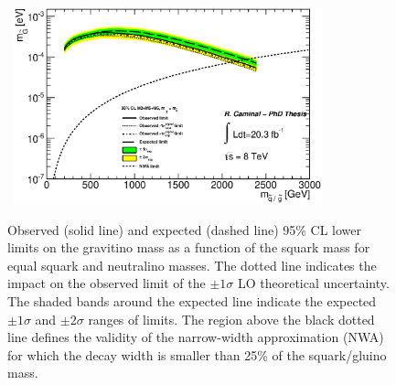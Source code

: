 \begin{figure}[!ht]
\begin{center}
\mbox{
\includegraphics[width=0.795\textwidth]{Interpretations/Figures/ModelIndependentGravitino_combined_mGLimit_Stop_A4_A9_A10.eps}
}
\end{center}
\caption[95\% CL lower limits on the gravitino mass as a function of the squark mass for equal squark and neutralino masses.]{Observed (solid line) and expected (dashed line) 95\% CL lower limits on the gravitino mass as a function of the squark mass for equal squark and neutralino masses. The dotted line indicates the impact on the observed limit of the $\pm1\sigma$ LO theoretical uncertainty. The shaded bands around the expected line indicate the expected $\pm1\sigma$ and $\pm2\sigma$ ranges of limits. 
  The region above the black dotted line defines the validity of the narrow-width approximation (NWA) for which the decay width is smaller than 25\% of the squark/gluino mass.}
\label{fig:GravitinoMassExclusion_mqmg}
\end{figure}


